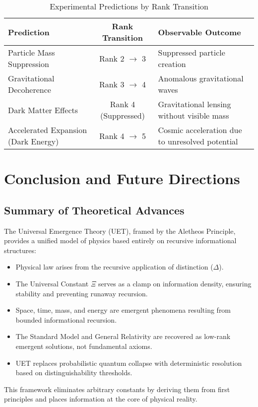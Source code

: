 \documentclass[12pt,a4paper]{article}
\begin{document}
\begin{table}[h]
\centering
\begin{tabular}{|l|c|l|}
\hline
\textbf{Prediction} & \textbf{Rank Transition} & \textbf{Observable Outcome} \\
\hline
Particle Mass Suppression & Rank 2 \(\to\) 3 & Suppressed particle creation \\
Gravitational Decoherence & Rank 3 \(\to\) 4 & Anomalous gravitational waves \\
Dark Matter Effects & Rank 4 (Suppressed) & Gravitational lensing without visible mass \\
Accelerated Expansion (Dark Energy) & Rank 4 \(\to\) 5 & Cosmic acceleration due to unresolved potential \\
\hline
\end{tabular}
\caption{Experimental Predictions by Rank Transition}
\end{table}
\section{Conclusion and Future Directions}

\subsection{Summary of Theoretical Advances}

The Universal Emergence Theory (UET), framed by the Aletheos Principle, provides a unified model of physics based entirely on recursive informational structures:

\begin{itemize}
    \item Physical law arises from the recursive application of distinction (\(\Delta\)).
    \item The Universal Constant \(\Xi\) serves as a clamp on information density, ensuring stability and preventing runaway recursion.
    \item Space, time, mass, and energy are emergent phenomena resulting from bounded informational recursion.
    \item The Standard Model and General Relativity are recovered as low-rank emergent solutions, not fundamental axioms.
    \item UET replaces probabilistic quantum collapse with deterministic resolution based on distinguishability thresholds.
\end{itemize}

This framework eliminates arbitrary constants by deriving them from first principles and places information at the core of physical reality.
\end{document}
